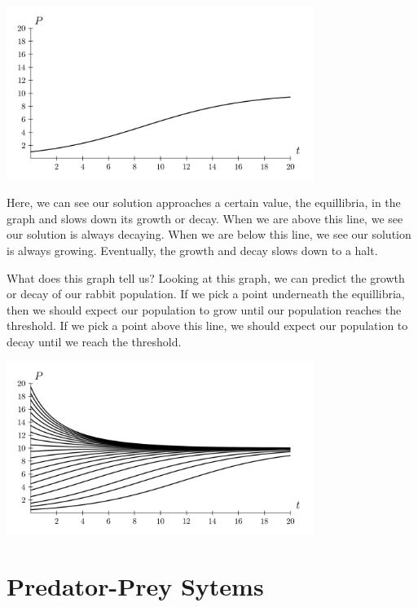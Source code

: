 \documentclass{amsart}
\theoremstyle{definition}
\numberwithin{equation}{section}
\begin{document}
\begin{sansmath}
\begin{center}
  \includegraphics[width=10cm]{LogisticSingle}
\end{center}

Here, we can see our solution approaches a certain value, the equillibria, in the graph and slows down its growth or decay. When we are above this line, we see our solution is always decaying. When we are below this line, we see our solution is always growing. Eventually, the growth and decay slows down to a halt.

What does this graph tell us? Looking at this graph, we can predict the growth or decay of our rabbit population. If we pick a point underneath the equillibria, then we should expect our population to grow until our population reaches the threshold. If we pick a point above this line, we should expect our population to decay until we reach the threshold.

\begin{center}
  \includegraphics[width=10cm]{LogisticGroup}
\end{center}

\section{Predator-Prey Sytems}


\end{sansmath}
\end{document}

